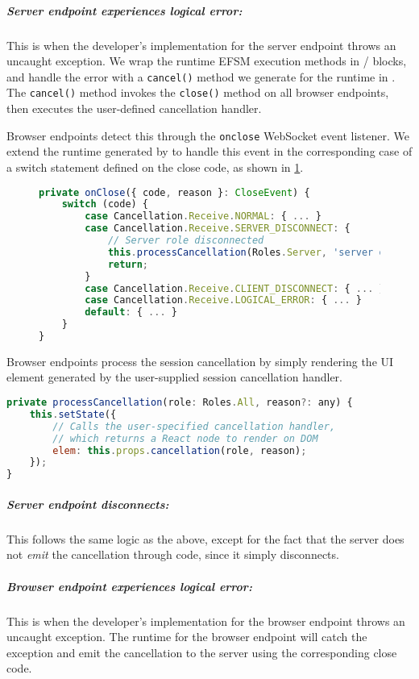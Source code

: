 \subparagraph{Server endpoint experiences logical error:}
This is when the developer's implementation for the server
endpoint throws an uncaught exception. 
We wrap the runtime EFSM execution methods in
/
blocks, and handle the error with a \texttt{cancel()}
method we generate for the runtime in .
The \texttt{cancel()} method invokes
the \texttt{close()} method on all browser endpoints,
then executes the user-defined cancellation handler.

Browser endpoints detect this through the \texttt{onclose}
WebSocket event listener. We extend the runtime
generated by  to handle this event
in the corresponding case of a switch statement
defined on the close code, 
as shown in \cref{lst:canceloncloseclient}.

\begin{figure}[!h]
\begin{lstlisting}[language=javascript,tabsize=2]
private onClose({ code, reason }: CloseEvent) {
	switch (code) {
		case Cancellation.Receive.NORMAL: { ... }
		case Cancellation.Receive.SERVER_DISCONNECT: {
			// Server role disconnected
			this.processCancellation(Roles.Server, 'server disconnected')
			return;
		}
		case Cancellation.Receive.CLIENT_DISCONNECT: { ... }
		case Cancellation.Receive.LOGICAL_ERROR: { ... }
		default: { ... }
	}
}
\end{lstlisting}
\label{lst:canceloncloseclient}
\end{figure}

Browser endpoints process the session cancellation
by simply rendering the UI element generated
by the user-supplied session cancellation handler.

\begin{lstlisting}[language=javascript,tabsize=2]
private processCancellation(role: Roles.All, reason?: any) {
	this.setState({
		// Calls the user-specified cancellation handler,
		// which returns a React node to render on DOM
		elem: this.props.cancellation(role, reason);
	});
}
\end{lstlisting}

\subparagraph{Server endpoint disconnects:}
This follows the same logic as the above,
except for the fact that the server does not
\textit{emit} the cancellation through code, since
it simply disconnects.

\subparagraph{Browser endpoint experiences logical error:}
This is when the developer's implementation for the browser
endpoint throws an uncaught exception. 
The runtime for the browser endpoint will catch
the exception and emit the cancellation to the server
using the corresponding close code.

